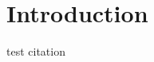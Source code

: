 \chapter{Introduction}\label{ch:introduction}

test citation \citep{openaigym} \citet{openaigym} \cite{openaigym}